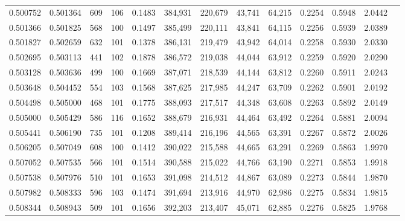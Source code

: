 \begin{tabular}{rrrrrrrrrrrrr}
0.500752 & 0.501364 &    609 &   106 &                                     0.1483 & 384,931 & 220,679 &  43,741 &  64,215 & 0.2254 & 0.5948 & 2.0442 \\
0.501366 & 0.501825 &    568 &   100 &                                     0.1497 & 385,499 & 220,111 &  43,841 &  64,115 & 0.2256 & 0.5939 & 2.0389 \\
0.501827 & 0.502659 &    632 &   101 &                                     0.1378 & 386,131 & 219,479 &  43,942 &  64,014 & 0.2258 & 0.5930 & 2.0330 \\
0.502695 & 0.503113 &    441 &   102 &                                     0.1878 & 386,572 & 219,038 &  44,044 &  63,912 & 0.2259 & 0.5920 & 2.0290 \\
0.503128 & 0.503636 &    499 &   100 &                                     0.1669 & 387,071 & 218,539 &  44,144 &  63,812 & 0.2260 & 0.5911 & 2.0243 \\
0.503648 & 0.504452 &    554 &   103 &                                     0.1568 & 387,625 & 217,985 &  44,247 &  63,709 & 0.2262 & 0.5901 & 2.0192 \\
0.504498 & 0.505000 &    468 &   101 &                                     0.1775 & 388,093 & 217,517 &  44,348 &  63,608 & 0.2263 & 0.5892 & 2.0149 \\
0.505000 & 0.505429 &    586 &   116 &                                     0.1652 & 388,679 & 216,931 &  44,464 &  63,492 & 0.2264 & 0.5881 & 2.0094 \\
0.505441 & 0.506190 &    735 &   101 &                                     0.1208 & 389,414 & 216,196 &  44,565 &  63,391 & 0.2267 & 0.5872 & 2.0026 \\
0.506205 & 0.507049 &    608 &   100 &                                     0.1412 & 390,022 & 215,588 &  44,665 &  63,291 & 0.2269 & 0.5863 & 1.9970 \\
0.507052 & 0.507535 &    566 &   101 &                                     0.1514 & 390,588 & 215,022 &  44,766 &  63,190 & 0.2271 & 0.5853 & 1.9918 \\
0.507538 & 0.507976 &    510 &   101 &                                     0.1653 & 391,098 & 214,512 &  44,867 &  63,089 & 0.2273 & 0.5844 & 1.9870 \\
0.507982 & 0.508333 &    596 &   103 &                                     0.1474 & 391,694 & 213,916 &  44,970 &  62,986 & 0.2275 & 0.5834 & 1.9815 \\
0.508344 & 0.508943 &    509 &   101 &                                     0.1656 & 392,203 & 213,407 &  45,071 &  62,885 & 0.2276 & 0.5825 & 1.9768 \\

\end{tabular}
